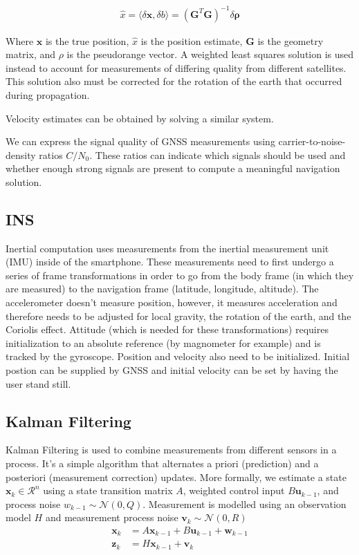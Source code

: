 \documentclass[twoside]{article}
\begin{document}
\begin{align*}
    \hat{x} = \langle \delta \mathbf{x}, \delta b\rangle = (\mathbf{G}^T\mathbf{G})^{-1}\delta\mathbf{\rho} 
\end{align*}

Where $\mathbf{x}$ is the true position, $\hat{x}$ is the position estimate, $\mathbf{G}$ is the geometry matrix,
and $\rho$ is the pseudorange vector. A weighted least squares solution is used instead to account
for measurements of differing quality from different satellites. This solution also must be corrected for the
rotation of the earth that occurred during propagation.

Velocity estimates can be obtained by solving a similar system.

We can express the signal quality of GNSS measurements using carrier-to-noise-density ratios $C/N_0$. These
ratios can indicate which signals should be used and whether enough strong signals are present to compute
a meaningful navigation solution.
\subsection{INS}
Inertial computation uses measurements from the inertial measurement unit (IMU) inside of the smartphone.
These measurements need to first undergo a series of frame transformations in order to go from the body
frame (in which they are measured) to the navigation frame (latitude, longitude, altitude). The accelerometer
doesn't measure position, however, it measures acceleration and therefore needs to be adjusted for local
gravity, the rotation of the earth, and the Coriolis effect. Attitude (which is needed for these transformations)
requires initialization to an absolute reference (by magnometer for example) and is tracked by the gyroscope.
Position and velocity also need to be initialized. Initial postion can be supplied by GNSS and initial velocity
can be set by having the user stand still.
\subsection{Kalman Filtering}
Kalman Filtering is used to combine measurements from different sensors in a process. It's a simple algorithm
that alternates a priori (prediction) and a posteriori (measurement correction) updates. More formally, we
estimate a state $\mathbf{x}_k \in \mathcal{R}^n$ using a state transition matrix $A$, weighted control input
$B\mathbf{u}_{k - 1}$, and process noise $w_{k - 1} \sim \mathcal{N}(0,Q)$. Measurement is modelled using an
observation model $H$ and measurement process noise $\mathbf{v}_k \sim \mathcal{N}(0,R)$
\begin{align*}
    \mathbf{x}_k &= A\mathbf{x}_{k-1} + B\mathbf{u}_{k - 1} + \mathbf{w}_{k - 1} \\
    \mathbf{z}_k &= H\mathbf{x}_{k-1} + \mathbf{v}_k
\end{align*}
\end{document}
